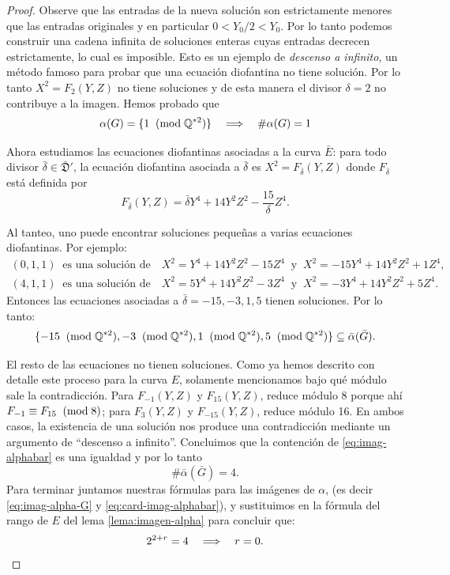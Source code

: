 \begin{proof}
Observe que las entradas de la nueva solución son estrictamente menores que las entradas originales y en particular $0<Y_0/2<Y_0$. Por lo tanto podemos construir una cadena infinita de soluciones enteras cuyas entradas decrecen estrictamente, lo cual es imposible. Esto es un ejemplo de \emph{descenso a infinito}, un método famoso para probar que una ecuación diofantina no tiene solución. Por lo tanto $X^2=F_2(Y,Z)$ no tiene soluciones y de esta manera el divisor $\delta=2$ no contribuye a la imagen. Hemos probado que
\begin{equation}\label{eq:imag-alpha-G}
	\alpha(G)=\{1\;\;(\mathrm{mod}\; \mathbb{Q}^{*2})\}\quad\Longrightarrow\quad \#\alpha(G)=1 
\end{equation}

Ahora estudiamos las ecuaciones diofantinas asociadas a la curva $\bar{E}$: para todo divisor $\bar{\delta}\in\bar{\mathfrak{D}}'$, la ecuación diofantina asociada a $\bar{\delta}$ es $X^2=F_{\bar{\delta}}(Y,Z)$ donde $F_{\bar{\delta}}$ está definida por
\[
	F_{\bar{\delta}}(Y,Z)=\bar{\delta}Y^4+14Y^2 Z^2-\frac{15}{\delta}Z^4.
\]

Al tanteo, uno puede encontrar soluciones pequeñas a varias ecuaciones diofantinas. Por ejemplo:
\begin{gather*}
	(0,1,1)\;\;\text{es una solución de}\quad X^2=Y^4+14 Y^2 Z^2-15Z^4\;\;\text{y}\;\; X^2=-15Y^4+14 Y^2 Z^2+1Z^4, \\
	(4,1,1)\;\;\text{es una solución de}\quad X^2=5Y^4+14 Y^2 Z^2-3Z^4\;\;\text{y}\;\; X^2=-3Y^4+14 Y^2 Z^2+5Z^4.
\end{gather*}
Entonces las ecuaciones asociadas a $\bar{\delta}=-15,-3,1,5$ tienen soluciones. Por lo tanto:
\begin{equation}\label{eq:imag-alphabar}
	\{-15\;\;(\mathrm{mod}\; \mathbb{Q}^{*2}),-3\;\;(\mathrm{mod}\; \mathbb{Q}^{*2}),1\;\;(\mathrm{mod}\; \mathbb{Q}^{*2}),5\;\;(\mathrm{mod}\; \mathbb{Q}^{*2})\}\subseteq\bar{\alpha}(\bar{G}).
\end{equation}



El resto de las ecuaciones no tienen soluciones. Como ya hemos descrito con detalle este proceso para la curva $E$, solamente mencionamos bajo qué módulo sale la contradicción. Para $F_{-1}(Y,Z)$ y $F_{15}(Y,Z)$, reduce módulo 8 porque ahí $F_{-1}\equiv F_{15}\;\;(\mathrm{mod}\; 8)$; para $F_3(Y,Z)$ y $F_{-15}(Y,Z)$, reduce módulo 16. En ambos casos, la existencia de una solución nos produce una contradicción mediante un argumento de ``descenso a infinito''. Concluimos que la contención de \eqref{eq:imag-alphabar} es una igualdad y por lo tanto
\begin{equation}\label{eq:card-imag-alphabar}
	\#\bar{\alpha}(\bar{G})=4.
\end{equation}
Para terminar juntamos nuestras fórmulas para las imágenes de $\alpha$, (es decir \eqref{eq:imag-alpha-G} y \eqref{eq:card-imag-alphabar}), y sustituimos en la fórmula del rango de $E$ del lema \ref{lema:imagen-alpha} para concluir que:
\[
	2^{2+r}=4\quad\Longrightarrow\quad r=0.
\]
\end{proof}